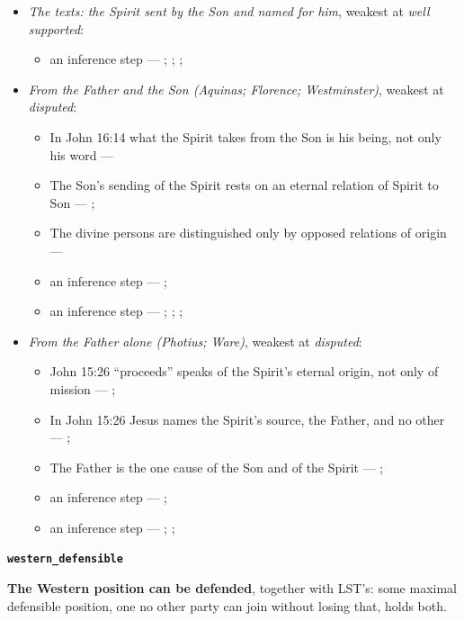 \documentclass[11pt,paper=\testimonypaper,DIV=13,parskip=false]{scrartcl}
\begin{document}
\begin{itemize}
\item \emph{The texts: the Spirit sent by the Son and named for him}, weakest at \emph{well supported}:
\begin{itemize}
\item an inference step --- \cite[3, The Triune God]{kibbey-living-systematic-theology-2026}; \cite{photius-mystagogy-1987}; \cite[178]{vischer-spirit-of-god-1981}; \cite[I, q. 36, a. 2]{aquinas-summa-1920}
\end{itemize}
\item \emph{From the Father and the Son (Aquinas; Florence; Westminster)}, weakest at \emph{disputed}:
\begin{itemize}
\item In John 16:14 what the Spirit takes from the Son is his being, not only his word --- \cite[I, q. 36, a. 2]{aquinas-summa-1920}
\item The Son’s sending of the Spirit rests on an eternal relation of Spirit to Son --- \cite[I, q. 36, a. 2]{aquinas-summa-1920}; \cite[165]{vischer-spirit-of-god-1981}
\item The divine persons are distinguished only by opposed relations of origin --- \cite[I, q. 36, a. 2]{aquinas-summa-1920}
\item an inference step --- \cite[I, q. 36, a. 2]{aquinas-summa-1920}; \cite{photius-mystagogy-1987}
\item an inference step --- \cite[165--169]{vischer-spirit-of-god-1981}; \cite[144]{vischer-spirit-of-god-1981}; \cite[183--184]{vischer-spirit-of-god-1981}; \cite[I, q. 43, a. 8]{aquinas-summa-1920}
\end{itemize}
\item \emph{From the Father alone (Photius; Ware)}, weakest at \emph{disputed}:
\begin{itemize}
\item John 15:26 “proceeds” speaks of the Spirit’s eternal origin, not only of mission --- \cite[I, q. 36, a. 2]{aquinas-summa-1920}; \cite{photius-mystagogy-1987}
\item In John 15:26 Jesus names the Spirit’s source, the Father, and no other --- \cite{photius-mystagogy-1987}; \cite{ware-orthodox-church-1993}
\item The Father is the one cause of the Son and of the Spirit --- \cite{photius-mystagogy-1987}; \cite{ware-orthodox-church-1993}
\item an inference step --- \cite{photius-mystagogy-1987}; \cite[I, q. 36, a. 2]{aquinas-summa-1920}
\item an inference step --- \cite[Florence, Session 6 (1439), Laetentur caeli]{tanner-decrees-1990}; \cite{pcpcu-greek-latin-traditions-1995}; \cite{photius-mystagogy-1987}
\end{itemize}
\end{itemize}
\par\medskip\noindent\textbf{\texttt{western\_\allowbreak{}defensible}}\par\nobreak\noindent
\textbf{The Western position can be defended}, together with LST’s: some maximal defensible position, one no other party can join without losing that, holds both.
\end{document}
